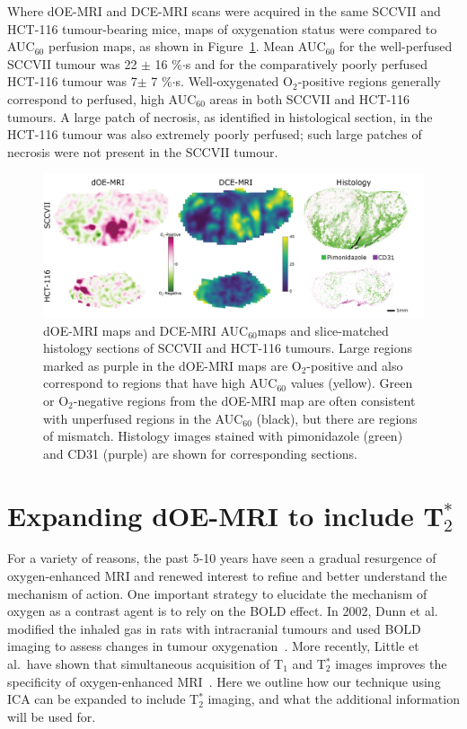 Where \acs{dOE-MRI} and DCE-MRI scans were acquired in the same SCCVII and HCT-116 tumour-bearing mice,  maps of oxygenation status were compared to \acs{AUC}$_{60}$ perfusion maps, as shown in Figure~\ref{fig_perfusion}.
Mean \acs{AUC}$_{60}$ for the well-perfused SCCVII tumour was 22 $\pm$ 16 \%$\cdot$s and for the comparatively poorly perfused HCT-116 tumour was 7$\pm$ 7 \%$\cdot$s.
Well-oxygenated O$_2$-positive regions generally correspond to perfused, high \acs{AUC}$_{60}$ areas in both SCCVII and HCT-116 tumours.
A large patch of necrosis, as identified in histological section, in the HCT-116 tumour was also extremely poorly perfused; such large patches of necrosis were not present in the SCCVII tumour.

\begin{figure}[htbp]
   \centering
   \includegraphics[width=\textwidth]{futurework/futurework-images/fig_perfusion.png} %
   \caption{\acs{dOE-MRI} maps and DCE-MRI \acs{AUC}$_{60}$maps and slice-matched histology sections of SCCVII and HCT-116 tumours. Large regions marked as purple in the \acs{dOE-MRI} maps are O$_2$-positive and also correspond to regions that have high \acs{AUC}$_{60}$ values (yellow). Green or O$_2$-negative regions from the \acs{dOE-MRI} map are often consistent with unperfused regions in the \acs{AUC}$_{60}$ (black), but there are regions of mismatch. Histology images stained with pimonidazole (green) and CD31 (purple) are shown for corresponding sections.
   \label{fig_perfusion}}
\end{figure}

\section{Expanding \texorpdfstring{\acs{dOE-MRI}}{dOE-MRI} to include \texorpdfstring{T$_2^*$}{T2*}}
\label{futurework:expandingdOEMRI_T2*}

For a variety of reasons, the past 5-10 years have seen a gradual resurgence of oxygen-enhanced MRI and renewed interest to refine and better understand the mechanism of action.
One important strategy to elucidate the mechanism of oxygen as a contrast agent is to rely on the \acs{BOLD} effect.
In 2002, Dunn et al. modified the inhaled gas in rats with intracranial tumours and used BOLD imaging to assess changes in tumour oxygenation~\cite{Dunn:2002ji}.
More recently, Little et al.\ have shown that simultaneous acquisition of T$_1$ and T$_2^*$ images improves the specificity of oxygen-enhanced MRI~\cite{Little:2018iu}.
Here we outline how our technique using \acs{ICA} can be expanded to include T$_2^*$ imaging, and what the additional information will be used for.

